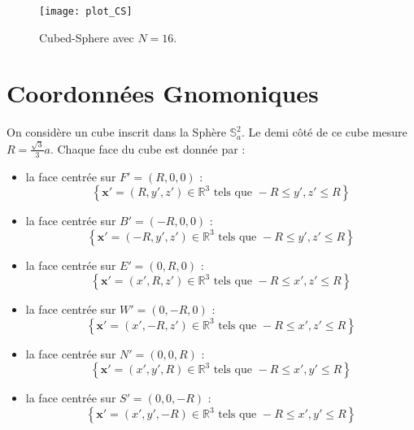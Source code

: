 \begin{figure}
\begin{center}
\texttt{[image: plot\_CS]}
\end{center}
\caption{Cubed-Sphere avec $N=16$.}
\end{figure}















\section{Coordonnées Gnomoniques}

On considère un cube inscrit dans la Sphère $\mathbb{S}_a^2$. Le demi côté de ce cube mesure $R=\frac{\sqrt{3}}{3}a$. Chaque face du cube est donnée par :
\begin{itemize}
\item la face centrée sur $F'=(R,0,0)$ : 
\begin{equation}
\left\lbrace
\mathbf{x}' = (R,y',z') \in \mathbb{R}^3 \text{ tels que } -R  \leq y',z' \leq R
\right\rbrace
\end{equation}

\item la face centrée sur $B'=(-R,0,0)$ : 
\begin{equation}
\left\lbrace
\mathbf{x}' = (-R,y',z') \in \mathbb{R}^3 \text{ tels que } -R  \leq y',z' \leq R
\right\rbrace
\end{equation}

\item la face centrée sur $E'=(0,R,0)$ : 
\begin{equation}
\left\lbrace
\mathbf{x}' = (x',R,z') \in \mathbb{R}^3 \text{ tels que } -R  \leq x',z' \leq R
\right\rbrace
\end{equation}

\item la face centrée sur $W'=(0,-R,0)$ : 
\begin{equation}
\left\lbrace
\mathbf{x}' = (x',-R,z') \in \mathbb{R}^3 \text{ tels que } -R  \leq x',z' \leq R
\right\rbrace
\end{equation}

\item la face centrée sur $N'=(0,0,R)$ : 
\begin{equation}
\left\lbrace
\mathbf{x}' = (x',y',R) \in \mathbb{R}^3 \text{ tels que } -R  \leq x',y' \leq R
\right\rbrace
\end{equation}

\item la face centrée sur $S'=(0,0,-R)$ : 
\begin{equation}
\left\lbrace
\mathbf{x}' = (x',y',-R) \in \mathbb{R}^3 \text{ tels que } -R  \leq x',y' \leq R
\right\rbrace
\end{equation}
\end{itemize}


